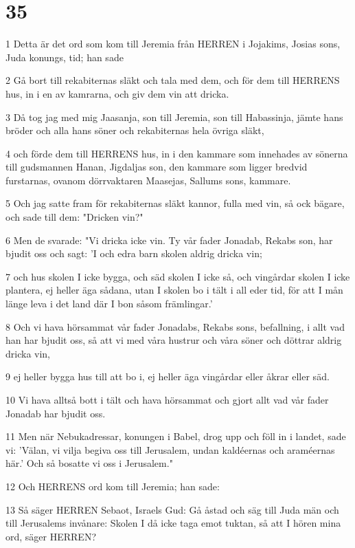 \chapter{35}

\par 1 Detta är det ord som kom till Jeremia från HERREN i Jojakims, Josias sons, Juda konungs, tid; han sade
\par 2 Gå bort till rekabiternas släkt och tala med dem, och för dem till HERRENS hus, in i en av kamrarna, och giv dem vin att dricka.
\par 3 Då tog jag med mig Jaasanja, son till Jeremia, son till Habassinja, jämte hans bröder och alla hans söner och rekabiternas hela övriga släkt,
\par 4 och förde dem till HERRENS hus, in i den kammare som innehades av sönerna till gudsmannen Hanan, Jigdaljas son, den kammare som ligger bredvid furstarnas, ovanom dörrvaktaren Maasejas, Sallums sons, kammare.
\par 5 Och jag satte fram för rekabiternas släkt kannor, fulla med vin, så ock bägare, och sade till dem: "Dricken vin?"
\par 6 Men de svarade: "Vi dricka icke vin. Ty vår fader Jonadab, Rekabs son, har bjudit oss och sagt: 'I och edra barn skolen aldrig dricka vin;
\par 7 och hus skolen I icke bygga, och säd skolen I icke så, och vingårdar skolen I icke plantera, ej heller äga sådana, utan I skolen bo i tält i all eder tid, för att I mån länge leva i det land där I bon såsom främlingar.'
\par 8 Och vi hava hörsammat vår fader Jonadabs, Rekabs sons, befallning, i allt vad han har bjudit oss, så att vi med våra hustrur och våra söner och döttrar aldrig dricka vin,
\par 9 ej heller bygga hus till att bo i, ej heller äga vingårdar eller åkrar eller säd.
\par 10 Vi hava alltså bott i tält och hava hörsammat och gjort allt vad vår fader Jonadab har bjudit oss.
\par 11 Men när Nebukadressar, konungen i Babel, drog upp och föll in i landet, sade vi: 'Välan, vi vilja begiva oss till Jerusalem, undan kaldéernas och araméernas här.' Och så bosatte vi oss i Jerusalem."
\par 12 Och HERRENS ord kom till Jeremia; han sade:
\par 13 Så säger HERREN Sebaot, Israels Gud: Gå åstad och säg till Juda män och till Jerusalems invånare: Skolen I då icke taga emot tuktan, så att I hören mina ord, säger HERREN?

